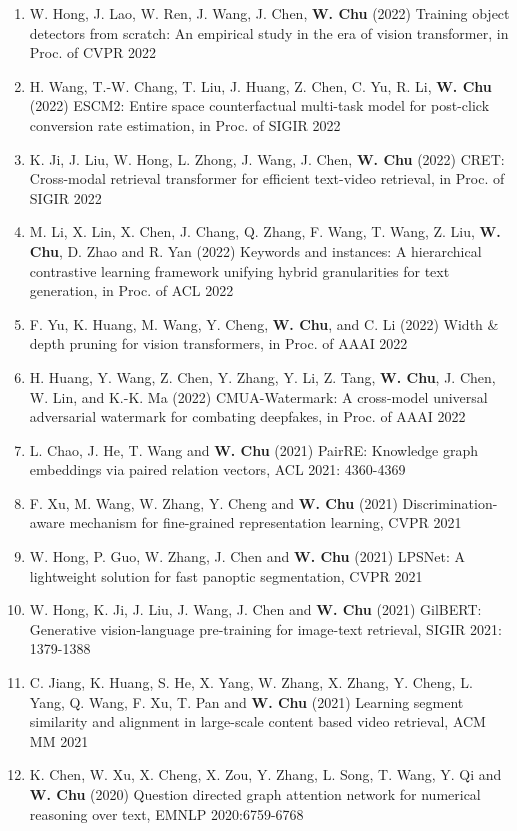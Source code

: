 \documentclass[line,10pt,final]{res}
\begin{document}
\begin{resume}
\begin{enumerate}
\item W. Hong, J. Lao, W. Ren, J. Wang, J. Chen,  {\bf W. Chu} (2022) Training object detectors from scratch: An empirical study in the era of vision transformer, in Proc. of CVPR 2022  
\item H. Wang, T.-W. Chang, T. Liu, J. Huang, Z. Chen, C. Yu, R. Li,  {\bf W. Chu} (2022) ESCM2: Entire space counterfactual multi-task model for post-click conversion rate estimation, in Proc. of SIGIR 2022  
\item K. Ji, J. Liu, W. Hong, L. Zhong, J. Wang, J. Chen,  {\bf W. Chu} (2022) CRET: Cross-modal retrieval transformer for efficient text-video retrieval, in Proc. of SIGIR 2022  
\item M. Li, X. Lin, X. Chen, J. Chang, Q. Zhang, F. Wang, T. Wang, Z. Liu,  {\bf W. Chu}, D. Zhao and R. Yan (2022) Keywords and instances: A hierarchical contrastive learning framework unifying hybrid granularities for text generation, in Proc. of ACL 2022  
\item F. Yu, K. Huang, M. Wang, Y. Cheng,  {\bf W. Chu}, and C. Li (2022) Width \& depth pruning for vision transformers, in Proc. of AAAI 2022  
\item H. Huang, Y. Wang, Z. Chen, Y. Zhang, Y. Li, Z. Tang,  {\bf W. Chu}, J. Chen, W. Lin, and K.-K. Ma (2022) CMUA-Watermark: A cross-model universal adversarial watermark for combating deepfakes, in Proc. of AAAI 2022  
\item L. Chao, J. He, T. Wang and  {\bf W. Chu} (2021) PairRE: Knowledge graph embeddings via paired relation vectors, ACL 2021: 4360-4369  
\item F. Xu, M. Wang, W. Zhang, Y. Cheng and  {\bf W. Chu} (2021) Discrimination-aware mechanism for fine-grained representation learning, CVPR 2021  
\item W. Hong, P. Guo, W. Zhang, J. Chen and  {\bf W. Chu} (2021) LPSNet: A lightweight solution for fast panoptic segmentation, CVPR 2021  
\item W. Hong, K. Ji, J. Liu, J. Wang, J. Chen and  {\bf W. Chu} (2021) GilBERT: Generative vision-language pre-training for image-text retrieval, SIGIR 2021: 1379-1388  
\item C. Jiang, K. Huang, S. He, X. Yang, W. Zhang, X. Zhang, Y. Cheng, L. Yang, Q. Wang, F. Xu, T. Pan and  {\bf W. Chu} (2021) Learning segment similarity and alignment in large-scale content based video retrieval, ACM MM 2021  
\item K. Chen, W. Xu, X. Cheng, X. Zou, Y. Zhang, L. Song, T. Wang, Y. Qi and  {\bf W. Chu} (2020) Question directed graph attention network for numerical reasoning over text, EMNLP 2020:6759-6768  

\end{enumerate}
\end{resume}
\end{document}
